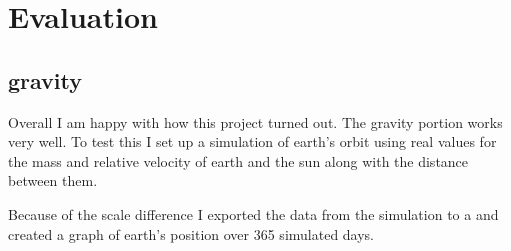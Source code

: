 \section{Evaluation}

	\subsection{gravity}
	Overall I am happy with how this project turned out. The gravity portion works very well. To test this I set up a simulation of earth's orbit using real values for the mass and relative velocity of earth and the sun along with the distance between them.
	
	Because of the scale difference I exported the data from the simulation to a  and created a graph of earth's position over 365 simulated days.
	
